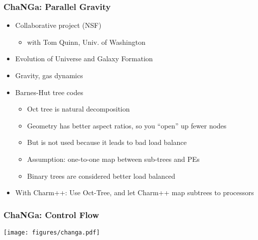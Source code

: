 \begin{frame}[t]
\frametitle{ChaNGa: Parallel Gravity}
  \begin{itemize}
    \item Collaborative project (NSF)
    \begin{itemize} 
        \item with Tom Quinn, Univ. of Washington
    \end{itemize}
    \pause
    \item Evolution of Universe and Galaxy Formation
    \item Gravity, gas dynamics
    \pause
    \item Barnes-Hut tree codes
    \begin{itemize} 
      \item Oct tree is natural decomposition
      \item Geometry has better aspect ratios, so you ``open” up fewer nodes
      \item But is not used because it leads to bad load balance
      \item Assumption: one-to-one map between sub-trees and PEs
      \item Binary trees are considered better load balanced
    \end{itemize}
    \pause
    \item With Charm++: Use Oct-Tree, and let Charm++ map subtrees to processors
  \end{itemize}
\end{frame}

\begin{frame}[t]
\frametitle{ChaNGa: Control Flow}
  \begin{center} \texttt{[image: figures/changa.pdf]} \end{center}
\end{frame}
